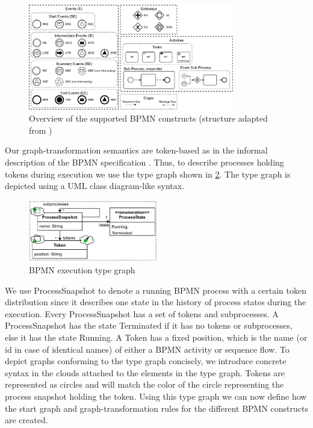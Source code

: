\documentclass[adraft, copyright, creativecommons]{eptcs} %
\begin{document}
\begin{figure}[h]
    \centering
    \includegraphics[width=0.8\textwidth]{images/bpmn_semantics-feature_overview.pdf}
    \caption{Overview of the supported BPMN constructs (structure adapted from \cite{houhouFirstOrderLogicVerification2022})}
    \label{fig:bpmnConstructsOverview}
\end{figure}

Our graph-transformation semantics are token-based as in the informal description of the BPMN specification \cite{objectmanagementgroupBusinessProcessModel2013}.
Thus, to describe processes holding tokens during execution we use the type graph shown in \cref{fig:typeGraph}.
The type graph is depicted using a UML class diagram-like syntax.

\begin{figure}[h]
    \centering
    \includegraphics[width=0.5\textwidth]{images/bpmn_semantics-typegraph.pdf}
    \caption{BPMN execution type graph}
    \label{fig:typeGraph}
\end{figure}

We use \textsf{ProcessSnapshot} to denote a running BPMN process with a certain token distribution since it describes one state in the history of process states during the execution.
Every \textsf{ProcessSnapshot} has a set of \textsf{tokens} and \textsf{subprocesses}.
A \textsf{ProcessSnapshot} has the state \textsf{Terminated} if it has no \textsf{tokens} or \textsf{subprocesses}, else it has the state \textsf{Running}.
A \textsf{Token} has a fixed \textsf{position}, which is the name (or id in case of identical names) of either a BPMN activity or sequence flow.
To depict graphs conforming to the type graph concisely, we introduce concrete syntax in the clouds attached to the elements in the type graph.
Tokens are represented as circles and will match the color of the circle representing the process snapshot holding the token.
Using this type graph we can now define how the start graph and graph-transformation rules for the different BPMN constructs are created.
\end{document}
